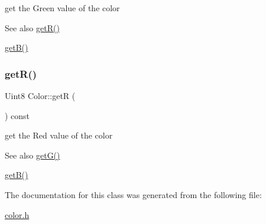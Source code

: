 get the Green value of the color 

\begin{DoxySeeAlso}{See also}
\mbox{\hyperlink{class_color_aecb6487557d6eb8386d1a11c37b026fb}{get\+R()}} 

\mbox{\hyperlink{class_color_a3121cb39d8669ea8cddbcfbbcc735e3f}{get\+B()}} 
\end{DoxySeeAlso}
\mbox{\label{class_color_aecb6487557d6eb8386d1a11c37b026fb}} 
\subsubsection{\texorpdfstring{get\+R()}{getR()}}
{\footnotesize\ttfamily Uint8 Color\+::getR (\begin{DoxyParamCaption}{ }\end{DoxyParamCaption}) const\hspace{0.3cm}{\ttfamily [inline]}}



get the Red value of the color 

\begin{DoxySeeAlso}{See also}
\mbox{\hyperlink{class_color_a50f526c1152871f13d2285f1d52e72db}{get\+G()}} 

\mbox{\hyperlink{class_color_a3121cb39d8669ea8cddbcfbbcc735e3f}{get\+B()}} 
\end{DoxySeeAlso}


The documentation for this class was generated from the following file\+:\begin{DoxyCompactItemize}
\item 
\mbox{\hyperlink{color_8h}{color.\+h}}\end{DoxyCompactItemize}
